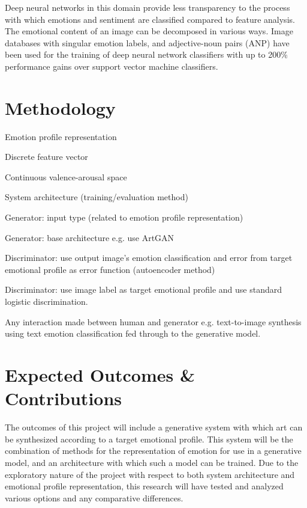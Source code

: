 \documentclass{article}
\begin{document}
Deep neural networks in this domain provide less transparency to the process with which emotions and sentiment are classified compared to feature analysis.
The emotional content of an image can be decomposed in various ways.
Image databases with singular emotion labels, and adjective-noun pairs (ANP) have been used for the training of deep neural network classifiers \citep{chen2014deepsentibank, yang2018visual} with up to 200\% performance gains over support vector machine classifiers.


\section{Methodology}

\begin{todolist}
	\item Emotion profile representation
	\begin{todolist}
		\item Discrete feature vector
		\item Continuous valence-arousal space
	\end{todolist}
	\item System architecture (training/evaluation method)
	\begin{todolist}
		\item Generator: input type (related to emotion profile representation)
		\item Generator: base architecture e.g. use ArtGAN \citep{tan2017artgan}
		\item Discriminator: use output image's emotion classification and error from target emotional profile as error function (autoencoder method)
		\item Discriminator: use image label as target emotional profile and use standard logistic discrimination.
	\end{todolist}
	\item Any interaction made between human and generator e.g. text-to-image synthesis using text emotion classification fed through to the generative model.
	
\end{todolist}


\section{Expected Outcomes \& Contributions}

The outcomes of this project will include a generative system with which art can be synthesized according to a target emotional profile.
This system will be the combination of methods for the representation of emotion for use in a generative model, and an architecture with which such a model can be trained.
Due to the exploratory nature of the project with respect to both system architecture and emotional profile representation, this research will have tested and analyzed various options and any comparative differences.
\end{document}
